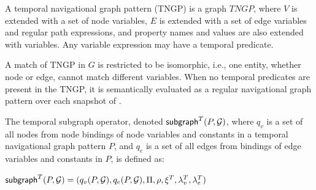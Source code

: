 \begin{definition}
\label{def:tngp}
A temporal navigational graph pattern (TNGP) is a graph $TNGP$, where
$V$ is extended with a set of node variables, $E$ is extended with a
set of edge variables and regular path expressions, and property names
and values are also extended with variables.  Any variable expression
may have a temporal predicate.

A match of TNGP in $G$ is restricted to be isomorphic, i.e., one
entity, whether node or edge, cannot match different variables.
When no temporal predicates are present in the TNGP, it is
  semantically evaluated as a regular navigational graph pattern over
  each snapshot of \ttt.
\end{definition}


\begin{definition}
\label{def:subv}
The temporal subgraph operator, denoted $\textsf{subgraph}^T(P,\mathcal{G})$, where $q_v$
is a set of all nodes from node bindings of node variables and
constants in a temporal navigational graph pattern $P$, and $q_e$ is a
set of all edges from bindings of edge variables and constants in $P$,
is defined as:

$\textsf{subgraph}^T(P,\mathcal{G}) = (q_v(P,\mathcal{G}), q_e(P,\mathcal{G}),\Pi,\rho,\xi^T,\lambda^T_v,\lambda^T_e)$
\end{definition}

